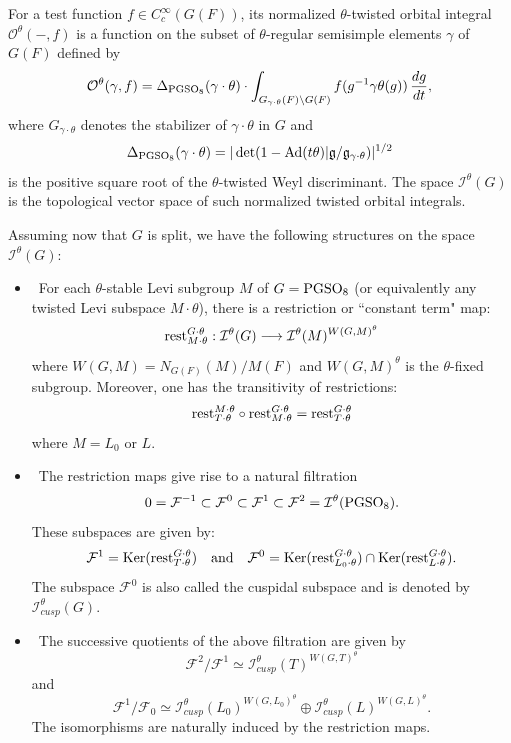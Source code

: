 \documentclass[11pt]{amsart}
\theoremstyle{plain}
\numberwithin{equation}{section}
\def\PGSO{{\rm PGSO}}
\begin{document}
 

For a test function $f \in C^{\infty}_c(G(F))$,  its normalized $\theta$-twisted orbital integral $ \mathcal{O}^{\theta}(-, f) $ is a function on the subset of $\theta$-regular semisimple elements $\gamma$ of $G(F)$ defined by
\begin{equation} \label{E:orb-int1}    
\mathcal{O}^{\theta}(\gamma,f) = \Delta_{\PGSO_8} (\gamma \cdot \theta) \cdot \int_{ G_{\gamma \cdot \theta}(F) \backslash G(F) }  f( g^{-1} \gamma \theta (g)) \, \frac{dg}{dt},
\end{equation}
where $G_{\gamma\cdot \theta}$ denotes the stabilizer of $\gamma \cdot \theta$ in $G$ and 
\[  \Delta_{\PGSO_8} (\gamma \cdot \theta )  = | \det ( 1 - {\rm Ad}(t\theta) | \mathfrak{g} /  \mathfrak{g}_{\gamma \cdot \theta})|^{1/2} \]
is the positive  square root of the $\theta$-twisted Weyl discriminant. The space $\mathcal{I}^{\theta}(G)$ is the topological vector space of such normalized twisted orbital integrals.
\vskip 5pt

Assuming now that $G$ is split, we have the following structures on the space $\mathcal{I}^{\theta}(G)$:
\vskip 5pt

\begin{itemize}
\item[(i)] \cite[I.3.1]{MW1} \,  For each $\theta$-stable Levi subgroup $M$ of $G = \PGSO_8$ (or equivalently any twisted Levi subspace $M \cdot \theta$), there is a restriction or ``constant term" map:
\[ {\rm rest}^{G \cdot \theta}_{M \cdot \theta} : \mathcal{I}^{\theta}(G) \longrightarrow \mathcal{I}^{\theta}(M)^{W(G,M)^{\theta}} \]
where $W(G,M) = N_{G(F)}(M)/M(F)$ and $W(G,M)^{\theta}$ is the  $\theta$-fixed subgroup. Moreover, one has the transitivity of restrictions:
\[  {\rm rest}^{M \cdot \theta}_{T \cdot \theta}   \circ  {\rm rest}^{G\cdot \theta}_{M \cdot \theta}   = {\rm rest}^{G \cdot \theta}_{T \cdot \theta} \]
where $M = L_0$ or $L$.
\vskip 5pt

\item[(ii)] \cite[I.4.2]{MW1}\,  The restriction maps  give rise to a natural filtration 
\[  0=\mathcal{F}^{-1}  \subset \mathcal{F}^0 \subset \mathcal{F}^1 \subset \mathcal{F}^2  = \mathcal{I}^{\theta}(\PGSO_8). \]
These subspaces are given by:
\[  \mathcal{F}^1 = {\rm Ker}({\rm rest}^{G \cdot \theta}_{T \cdot\theta})  \quad \text{and} \quad 
 \mathcal{F}^0 =  {\rm Ker}({\rm rest}^{G \cdot \theta}_{L_0 \cdot \theta}) \cap  {\rm Ker}({\rm rest}^{G \cdot \theta}_{L \cdot \theta}). \]
The subspace $\mathcal{F}^0$ is also called the cuspidal subspace and is denoted by $\mathcal{I}^{\theta}_{cusp}(G)$.
\vskip 5pt

\item[(iii)] \cite[I.4.2]{MW1}\, The successive quotients of the above filtration are given by
\[   \mathcal{F}^2 / \mathcal{F}^1 \simeq  \mathcal{I}^{\theta}_{cusp}(T)^{W(G,T)^{\theta}} \]
and
\[ \mathcal{F}^1/ \mathcal{F}_0 \simeq \mathcal{I}^{\theta}_{cusp}(L_0)^{W(G,L_0)^{\theta}} \oplus \mathcal{I}^{\theta}_{cusp}(L)^{W(G,L)^{\theta}}.   \]
The isomorphisms are naturally induced  by the restriction maps.
\end{itemize}
\end{document}

